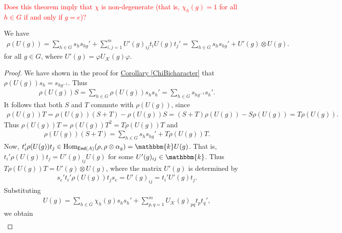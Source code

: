 \noindent\textcolor{red}{Does this theorem imply that $\chi$ is non-degenerate (that is, $\chi_h(g) = 1$ for all $h \in G$ if and only if $g = e$)?}\\

\noindent\begin{lemma}\label{RhoU} We have
\begin{align}
\rho(U(g)) = \sum_{h \in G} s_h s_{hg}' + \sum_{i,j=1}^m U'(g)_{ij}t_iU(g)t_j' = \sum_{h \in G} s_h s_{hg}' + U'(g) \otimes U(g).
\end{align}
\noindent for all $g \in G$, where $U'(g) = \varphi U_\mathcal{K}(g) \varphi$.\\
\end{lemma}

\noindent\begin{proof} We have shown in the proof for \hyperref[ChiBicharacter]{Corollary \ref*{ChiBicharacter}} that $\rho(U(g))s_h = s_{hg^{-1}}$. Thus
\begin{align*}
\rho(U(g))S = \sum_{h \in G}\rho(U(g))s_hs_h' = \sum_{h \in G}s_{hg^{-1}}s_h'.
\end{align*}
\noindent It follows that both $S$ and $T$ commute with $\rho(U(g))$, since
\begin{align*}
\rho(U(g))T = \rho(U(g))(S + T) - \rho(U(g))S = (S + T)\rho(U(g)) - S\rho(U(g)) = T\rho(U(g)).
\end{align*}
\noindent Thus $\rho(U(g))T = \rho(U(g))T^2 = T\rho(U(g))T$ and
\begin{align*}
\rho(U(g))(S + T) = \sum_{h \in G}s_hs_{hg}' + T\rho(U(g))T.
\end{align*}
\noindent Now, $t_i'\rho(U(g))t_j \in \homset_{\textcat{End}(A)}(\rho, \rho \otimes \alpha_g) = \mathbbm{k}U(g)$. That is, $t_i'\rho(U(g))t_j = U'(g)_{ij} U(g)$ for some $U'(g)_{ij} \in \mathbbm{k}$. %
Thus $T\rho(U(g))T = U'(g) \otimes U(g)$, where the matrix $U'(g)$ is determined by
\begin{align*}
s_e't_i'\rho(U(g))t_js_e = U'(g)_{ij} = t_i'U'(g)t_j.
\end{align*}
\noindent Substituting
\begin{align*}
U(g) = \sum_{h \in G}{\chi_h(g)s_hs_h'} + \sum_{p,q=1}^m{U_\mathcal{K}(g)_{pq}t_pt_q'},
\end{align*}
\noindent we obtain
\begin{align*}

\end{align*}
\end{proof}
